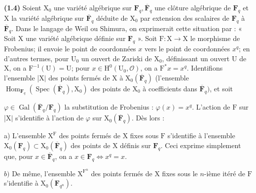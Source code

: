 \documentclass[10pt,leqno]{article}
\begin{document}
\noindent \textbf{(1.4)} Soient \(\mathrm{X}_{0}\) une variété algébrique sur \(\mathbf{F}_{q}, \overline{\mathbf{F}}_{q}\) une clôture algébrique de \(\mathbf{F}_{q}\) et \(\mathrm{X}\) la variété algébrique sur \(\overline{\mathbf{F}}_{q}\) déduite de \(\mathrm{X}_{0}\) par extension des scalaires de \(\mathbf{F}_{q}\) à \(\overline{\mathbf{F}}_{q}\). Dans le langage de Weil ou Shimura, on exprimerait cette situation par : « Soit \(\mathrm{X}\) une variété algébrique définie sur \(\mathbf{F}_{q}\) ». Soit \(\mathrm{F} : \mathrm{X}\longrightarrow \mathrm{X}\) le morphisme de Frobenius; il envoie le point de coordonnées \(x\) vers le point de coordonnées \(x^{q}\); en d’autres termes, pour \(\mathrm{U}_{0}\) un ouvert de Zariski de \(\mathrm{X}_{0}\), définissant un ouvert \(\mathrm{U}\) de \(\mathrm{X}\), on a \(\mathrm{F}^{- 1}(\mathrm{U})=\mathrm{U}\); pour \(x\in \mathrm{H}^{0}(\mathrm{U}_{0}, \mathcal{O})\), on a \(\mathrm{F}^{*}x=x^{q}\). Identifions l’ensemble |\(\mathrm{X}|\) des points fermés de \(\mathrm{X}\) à \(\mathrm{X}_{0}(\overline{\mathbf{F}}_{q})\) (l’ensemble \(\operatorname{Hom}_{\mathbf{F}_{q}}(\operatorname{Spec}(\overline{\mathbf{F}}_{q}), \mathrm{X}_{0})\) des points de \(\mathrm{X}_{0}\) à coefficients dans \(\overline{\mathbf{F}}_{q})\), et soit\par

\clearpage

\label{physical-4}\par\smallskip

\noindent \(\varphi \in \operatorname{Gal}(\overline{\mathbf{F}}_{q}/\mathbf{F}_{q})\) la substitution de Frobenius : \(\varphi (x)=x^{q}\). L’action de \(\mathrm{F}\) sur |\(\mathrm{X}|\) s’identifie à l’action de \(\varphi \) sur \(\mathrm{X}_{0}(\overline{\mathbf{F}}_{q})\). Dès lors :\par

\noindent a) L’ensemble \(\mathrm{X}^{\mathrm{F}}\) des points fermés de \(\mathrm{X}\) fixes sous \(\mathrm{F}\) s’identifie à l’ensemble \(\mathrm{X}_{0}(\mathbf{F}_{q})\subset \mathrm{X}_{0}(\overline{\mathbf{F}}_{q})\) des points de \(\mathrm{X}\) définis sur \(\mathbf{F}_{q}\). Ceci exprime simplement que, pour \(x\in \overline{\mathbf{F}}_{q}\), on a \(x\in \mathbf{F}_{q} \Leftrightarrow  x^{q}=x\).\par

\noindent \(b)\) De même, l’ensemble \(\mathrm{X}^{\mathrm{F}^{n}}\) des points fermés de \(\mathrm{X}\) fixes sous le \(n\)-ième itéré de \(\mathrm{F}\) s’identifie à \(\mathrm{X}_{0}(\mathbf{F}_{q^{n}})\).\par
\end{document}
